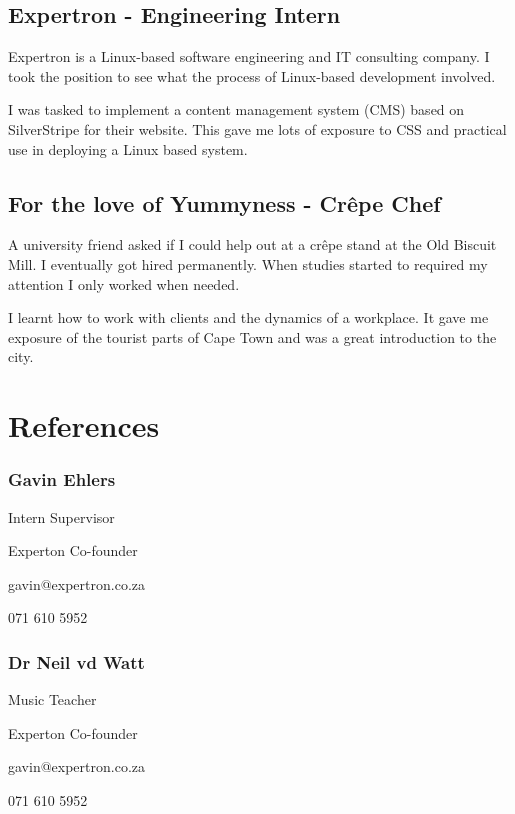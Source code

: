 \documentclass[twocolumn, 8pt]{extarticle}
\begin{document}
\subsection{Expertron - Engineering Intern}

Expertron is a Linux-based software engineering and IT
consulting company. I took the position to see what the
process of Linux-based development involved.

I was tasked to implement a content management system
(CMS) based on SilverStripe for their website. This gave me
lots of exposure to CSS and practical use in deploying a
Linux based system.

\subsection{For the love of Yummyness - Crêpe Chef}

A university friend asked if I could help out at a crêpe stand
at the Old Biscuit Mill. I eventually got hired permanently.
When studies started to required my attention I only worked
when needed.

I learnt how to work with clients and the dynamics of a
workplace. It gave me exposure of the tourist parts of Cape
Town and was a great introduction to the city.

\section{References}

\subsubsection{Gavin Ehlers}

Intern Supervisor
\begin{description}
	\setlength\itemsep{-1mm}
	\item Experton Co-founder
	\item gavin@expertron.co.za
	\item 071 610 5952
\end{description}

\subsubsection{Dr Neil vd Watt}

Music Teacher
\begin{description}
	\setlength\itemsep{-1mm}
	\item Experton Co-founder
	\item gavin@expertron.co.za
	\item 071 610 5952
\end{description}
\end{document}
